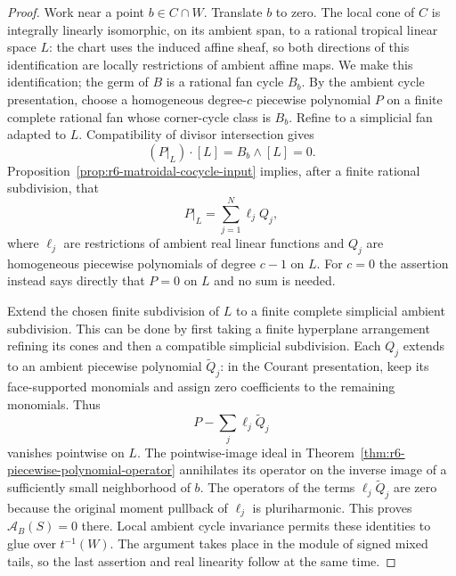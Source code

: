 \documentclass[11pt,a4paper]{article}
\numberwithin{equation}{section}
\theoremstyle{definition}
\theoremstyle{remark}
\begin{document}
\begin{proof}
Work near a point $b\in C\cap W$.  Translate $b$ to zero.  The local
cone of $C$ is integrally linearly isomorphic, on its ambient span,
to a rational tropical linear space $L$: the chart uses the induced
affine sheaf, so both directions of this identification are locally
restrictions of ambient affine maps.  We make this identification;
the germ of $B$ is a rational fan cycle $B_b$.  By the ambient cycle presentation,
choose a homogeneous degree-$c$ piecewise polynomial $P$ on a finite
complete rational fan whose corner-cycle class is $B_b$.  Refine to
a simplicial fan adapted to $L$.  Compatibility of divisor
intersection gives
\[
                        (P|_L)\cdot[L]=B_b\wedge[L]=0.
\]
Proposition~\ref{prop:r6-matroidal-cocycle-input} implies, after a
finite rational subdivision, that
\[
                  P|_L=\sum_{j=1}^N\ell_j Q_j,
\]
where $\ell_j$ are restrictions of ambient real linear functions
and $Q_j$ are homogeneous piecewise polynomials of degree $c-1$
on $L$.  For $c=0$ the assertion instead says directly that $P=0$
on $L$ and no sum is needed.

Extend the chosen finite subdivision of $L$ to a finite complete
simplicial ambient subdivision.  This can be done by first taking
a finite hyperplane arrangement refining its cones and then a
compatible simplicial subdivision.  Each $Q_j$ extends to an
ambient piecewise polynomial $\widetilde Q_j$: in the Courant
presentation, keep its face-supported monomials and assign zero
coefficients to the remaining monomials.  Thus
\[
                    P-\sum_j\ell_j\widetilde Q_j
\]
vanishes pointwise on $L$.  The pointwise-image ideal in
Theorem~\ref{thm:r6-piecewise-polynomial-operator} annihilates its
operator on the inverse image of a sufficiently small neighborhood
of $b$.  The operators of the terms
$\ell_j\widetilde Q_j$ are zero because the original moment
pullback of $\ell_j$ is pluriharmonic.  This proves
$\mathcal A_B(S)=0$ there.  Local ambient cycle invariance permits
these identities to glue over $t^{-1}(W)$.  The argument takes
place in the module of signed mixed tails, so the last assertion
and real linearity follow at the same time.
\end{proof}
\end{document}
